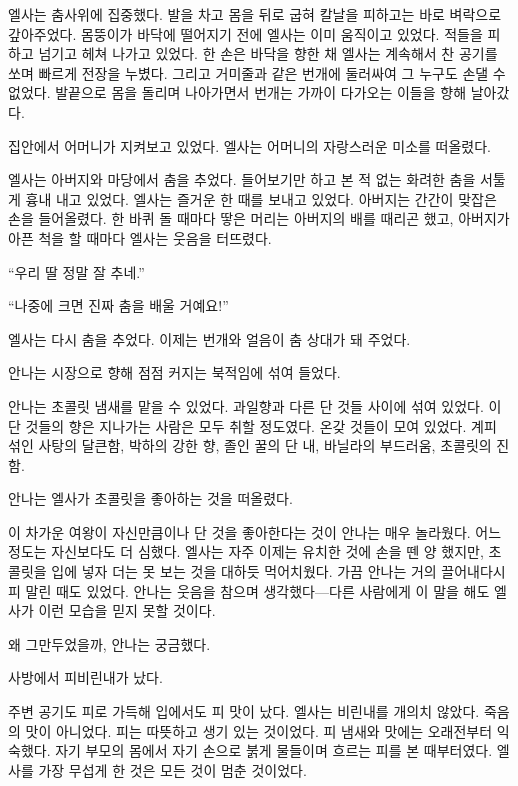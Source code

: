 엘사는 춤사위에 집중했다. 발을 차고 몸을 뒤로 굽혀 칼날을 피하고는 바로 벼락으로 갚아주었다. 몸뚱이가 바닥에 떨어지기 전에 엘사는 이미 움직이고 있었다. 적들을 피하고 넘기고 헤쳐 나가고 있었다. 한 손은 바닥을 향한 채 엘사는 계속해서 찬 공기를 쏘며 빠르게 전장을 누볐다. 그리고 거미줄과 같은 번개에 둘러싸여 그 누구도 손댈 수 없었다. 발끝으로 몸을 돌리며 나아가면서 번개는 가까이 다가오는 이들을 향해 날아갔다.

집안에서 어머니가 지켜보고 있었다. 엘사는 어머니의 자랑스러운 미소를 떠올렸다.

엘사는 아버지와 마당에서 춤을 추었다. 들어보기만 하고 본 적 없는 화려한 춤을 서툴게 흉내 내고 있었다. 엘사는 즐거운 한 때를 보내고 있었다. 아버지는 간간이 맞잡은 손을 들어올렸다. 한 바퀴 돌 때마다 땋은 머리는 아버지의 배를 때리곤 했고, 아버지가 아픈 척을 할 때마다 엘사는 웃음을 터뜨렸다.

``우리 딸 정말 잘 추네.''

``나중에 크면 진짜 춤을 배울 거예요!''

엘사는 다시 춤을 추었다. 이제는 번개와 얼음이 춤 상대가 돼 주었다.

\textbreak

안나는 시장으로 향해 점점 커지는 북적임에 섞여 들었다.

안나는 초콜릿 냄새를 맡을 수 있었다. 과일향과 다른 단 것들 사이에 섞여 있었다. 이 단 것들의 향은 지나가는 사람은 모두 취할 정도였다. 온갖 것들이 모여 있었다. 계피 섞인 사탕의 달큰함, 박하의 강한 향, 졸인 꿀의 단 내, 바닐라의 부드러움, 초콜릿의 진함.

안나는 엘사가 초콜릿을 좋아하는 것을 떠올렸다.

이 차가운 여왕이 자신만큼이나 단 것을 좋아한다는 것이 안나는 매우 놀라웠다. 어느 정도는 자신보다도 더 심했다. 엘사는 자주 이제는 유치한 것에 손을 뗀 양 했지만, 초콜릿을 입에 넣자 더는 못 보는 것을 대하듯 먹어치웠다. 가끔 안나는 거의 끌어내다시피 말린 때도 있었다. 안나는 웃음을 참으며 생각했다—다른 사람에게 이 말을 해도 엘사가 이런 모습을 믿지 못할 것이다.

왜 그만두었을까, 안나는 궁금했다.

\textbreak

사방에서 피비린내가 났다.

주변 공기도 피로 가득해 입에서도 피 맛이 났다. 엘사는 비린내를 개의치 않았다. 죽음의 맛이 아니었다. 피는 따뜻하고 생기 있는 것이었다. 피 냄새와 맛에는 오래전부터 익숙했다. 자기 부모의 몸에서 자기 손으로 붉게 물들이며 흐르는 피를 본 때부터였다. 엘사를 가장 무섭게 한 것은 모든 것이 멈춘 것이었다.


